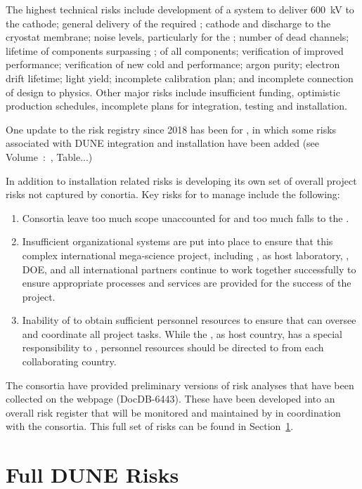 The highest technical risks include development of a system to
deliver \SI{600}{kV} to the \dual cathode; general delivery of the
required ; cathode and  discharge to the cryostat
membrane; noise levels, particularly for the ; %
number of dead channels; lifetime of components surpassing \dunelifetime{}; %
 of all components; verification of improved 
performance; verification of new cold   and   performance;
argon purity; electron drift lifetime; \phel light yield;
incomplete calibration plan; and incomplete connection of design to
physics. Other major risks include insufficient funding, optimistic
production schedules, incomplete plans for integration, testing and installation.

One update to the risk registry since 2018 has been for , in which some
risks  associated with  DUNE  integration and  installation have  been
added (see Volume~\volnumbersp:~\voltitlesp, Table...)

In addition to installation related risks  is developing its
own set of overall project risks not captured by conortia.  Key risks
for  to manage include the following:
\begin{enumerate}
\item Consortia leave too much scope unaccounted for and too much falls
  to  the .
\item Insufficient organizational systems are put into place to
  ensure that this complex international mega-science project,
  including , \fnal as host laboratory, \surf, DOE, and all international
  partners continue to work together successfully to ensure
  appropriate processes and services are provided for the success of
  the project.
\item Inability of  to obtain sufficient personnel resources to
  ensure that  can oversee and coordinate all project tasks.  While the , 
  as host country, has a special responsibility to , personnel resources should
  be directed to  from each collaborating country. 
\end{enumerate}

The consortia have provided preliminary versions of risk analyses that
have been collected on the  webpage (DocDB-6443). These have
been developed into an overall risk register that will be monitored
and maintained by  in coordination with the consortia. This
full set of risks can be found in 
Section~\ref{sec:fdsp-app-risk}.


\section{Full DUNE Risks}
\label{sec:fdsp-app-risk}



